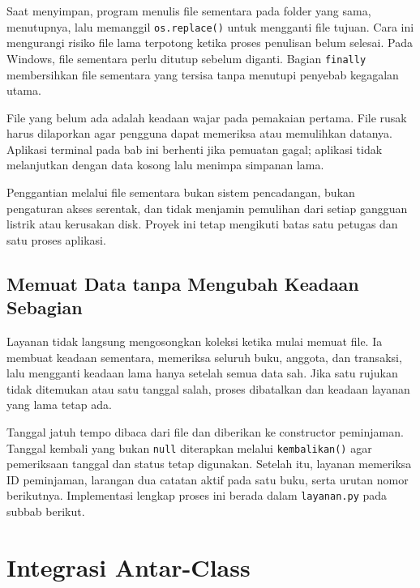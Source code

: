 Saat menyimpan, program menulis file sementara pada folder yang sama, menutupnya, lalu memanggil \texttt{os.replace()} untuk mengganti file tujuan. Cara ini mengurangi risiko file lama terpotong ketika proses penulisan belum selesai. Pada Windows, file sementara perlu ditutup sebelum diganti. Bagian \texttt{finally} membersihkan file sementara yang tersisa tanpa menutupi penyebab kegagalan utama.

\begin{penting}
File yang belum ada adalah keadaan wajar pada pemakaian pertama. File rusak harus dilaporkan agar pengguna dapat memeriksa atau memulihkan datanya. Aplikasi terminal pada bab ini berhenti jika pemuatan gagal; aplikasi tidak melanjutkan dengan data kosong lalu menimpa simpanan lama.

Penggantian melalui file sementara bukan sistem pencadangan, bukan pengaturan akses serentak, dan tidak menjamin pemulihan dari setiap gangguan listrik atau kerusakan disk. Proyek ini tetap mengikuti batas satu petugas dan satu proses aplikasi.
\end{penting}

\subsection{Memuat Data tanpa Mengubah Keadaan Sebagian}

Layanan tidak langsung mengosongkan koleksi ketika mulai memuat file. Ia membuat keadaan sementara, memeriksa seluruh buku, anggota, dan transaksi, lalu mengganti keadaan lama hanya setelah semua data sah. Jika satu rujukan tidak ditemukan atau satu tanggal salah, proses dibatalkan dan keadaan layanan yang lama tetap ada.

Tanggal jatuh tempo dibaca dari file dan diberikan ke constructor peminjaman. Tanggal kembali yang bukan \texttt{null} diterapkan melalui \texttt{kembalikan()} agar pemeriksaan tanggal dan status tetap digunakan. Setelah itu, layanan memeriksa ID peminjaman, larangan dua catatan aktif pada satu buku, serta urutan nomor berikutnya. Implementasi lengkap proses ini berada dalam \texttt{layanan.py} pada subbab berikut.

\section{Integrasi Antar-Class}

